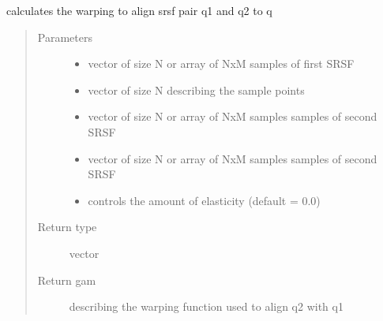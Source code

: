 \documentclass[letterpaper,10pt,english]{sphinxmanual}
\begin{document}

\begin{fulllineitems}
\label{\detokenize{utility_functions:utility_functions.optimum_reparam_pair}}
calculates the warping to align srsf pair q1 and q2 to q
\begin{quote}\begin{description}
\item[{Parameters}] \leavevmode\begin{itemize}
\item {} 
 \textendash{} vector of size N or array of NxM samples of first SRSF

\item {} 
 \textendash{} vector of size N describing the sample points

\item {} 
 \textendash{} vector of size N or array of NxM samples samples of second SRSF

\item {} 
 \textendash{} vector of size N or array of NxM samples samples of second SRSF

\item {} 
 \textendash{} controls the amount of elasticity (default = 0.0)

\end{itemize}

\item[{Return type}] \leavevmode
vector

\item[{Return gam}] \leavevmode
describing the warping function used to align q2 with q1

\end{description}\end{quote}

\end{fulllineitems}

\end{document}
